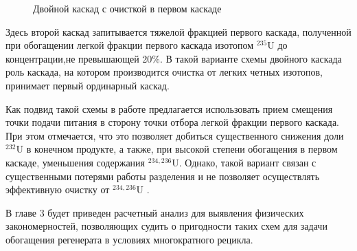 \begin{figure}[ht]
  \caption{Двойной каскад с очисткой в первом каскаде}\label{fig:pure_double}
\end{figure}

Здесь второй каскад запитывается тяжелой фракцией первого каскада, полученной при обогащении легкой фракции первого каскада изотопом $^{235}$U до концентрации,не превышающей 20\%.
В такой варианте схемы двойного каскада роль каскада, на котором производится очистка от легких четных изотопов, принимает первый ординарный каскад.

Как подвид такой схемы в работе \cite{palkinReprocessedUraniumPurification2013} предлагается использовать прием смещения точки подачи питания в сторону точки отбора легкой фракции первого каскада.
При этом отмечается, что это позволяет добиться существенного снижения доли $^{232}$U в конечном продукте, а также, при высокой степени обогащения в первом каскаде, уменьшения содержания $^{234,236}$U.
Однако, такой вариант связан с существенными потерями работы разделения и не позволяет осуществлять эффективную очистку от $^{234,236}$U \cite{palkinPurificationReprocessedUranium2016}.

В главе 3 будет приведен расчетный анализ для выявления физических закономерностей, позволяющих судить о пригодности таких схем для задачи обогащения регенерата в условиях многократного рецикла.

